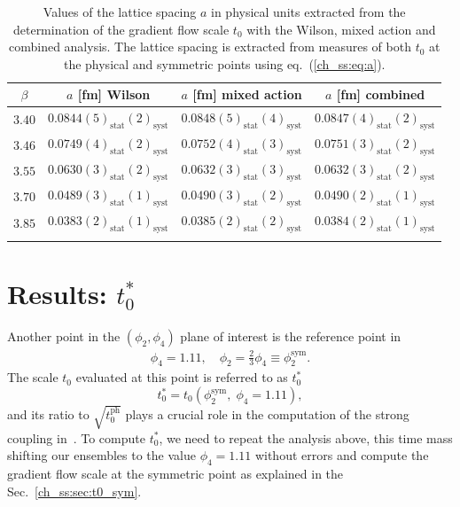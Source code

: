 \begin{longtable}{c c c c}
\label{ch_ss:tab:a}
$\beta$ & $a$ [fm] Wilson & $a$ [fm] mixed action & $a$ [fm] combined \\
\toprule
$3.40$ & $0.0844(5)_{\textrm{stat}}(2)_{\textrm{syst}}$ & $0.0848(5)_{\textrm{stat}}(4)_{\textrm{syst}}$ & $0.0847(4)_{\textrm{stat}}(2)_{\textrm{syst}}$ \\
$3.46$ & $0.0749(4)_{\textrm{stat}}(2)_{\textrm{syst}}$ & $0.0752(4)_{\textrm{stat}}(3)_{\textrm{syst}}$ & $0.0751(3)_{\textrm{stat}}(2)_{\textrm{syst}}$ \\
$3.55$ & $0.0630(3)_{\textrm{stat}}(2)_{\textrm{syst}}$ & $0.0632(3)_{\textrm{stat}}(3)_{\textrm{syst}}$ & $0.0632(3)_{\textrm{stat}}(2)_{\textrm{syst}}$ \\
$3.70$ & $0.0489(3)_{\textrm{stat}}(1)_{\textrm{syst}}$ & $0.0490(3)_{\textrm{stat}}(2)_{\textrm{syst}}$ & $0.0490(2)_{\textrm{stat}}(1)_{\textrm{syst}}$ \\
$3.85$ & $0.0383(2)_{\textrm{stat}}(1)_{\textrm{syst}}$ & $0.0385(2)_{\textrm{stat}}(2)_{\textrm{syst}}$ & $0.0384(2)_{\textrm{stat}}(1)_{\textrm{syst}}$ \\
\bottomrule
\caption{Values of the lattice spacing $a$ in physical units extracted from the determination of the gradient flow scale $t_0$ with the Wilson, mixed action and combined analysis. The lattice spacing is extracted from measures of both $t_0$ at the physical and symmetric points using eq.~(\ref{ch_ss:eq:a}).}
\end{longtable}

\section{Results: $t_0^*$}

Another point in the $(\phi_2,\phi_4)$ plane of interest is the reference point in~\citep{Bruno:2016plf}
\begin{gather}
\phi_4=1.11, \quad \phi_2=\frac{2}{3}\phi_4\equiv\phi_2^{\textrm{sym}}.
\end{gather}
The scale $t_0$ evaluated at this point is referred to as $t_0^*$
\begin{equation}
t_0^*=t_0\left(\phi_2^{\textrm{sym}},\;\phi_4=1.11\right),
\end{equation}
and its ratio to $\sqrt{t_0^{\textrm{ph}}}$ plays a crucial role in the computation of the strong coupling in~\citep{DallaBrida:2022eua}. To compute $t_0^{*}$, we need to repeat the analysis above, this time mass shifting our ensembles to the value $\phi_4=1.11$ without errors and compute the gradient flow scale at the symmetric point as explained in the Sec.~\ref{ch_ss:sec:t0_sym}.

